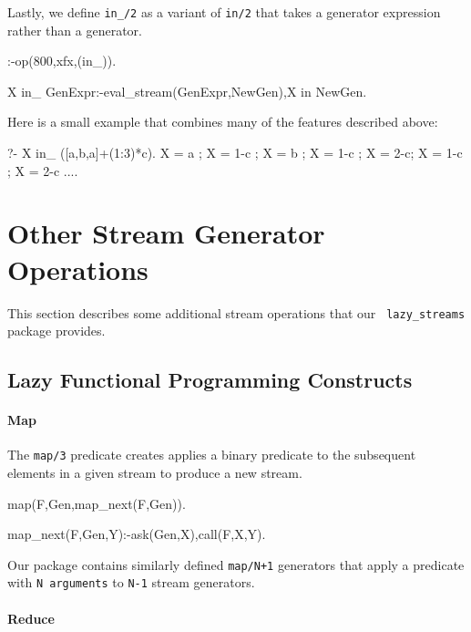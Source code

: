 \documentclass{new_tlp}
\begin{document}
Lastly, we define {\tt in\_/2} as a variant of \texttt{in/2} that takes a 
generator expression rather than a generator.
\begin{code}
:-op(800,xfx,(in_)).

X in_ GenExpr:-eval_stream(GenExpr,NewGen),X in NewGen.     
\end{code}
Here is a small example that combines many of the features described above:
\begin{codex}
?- X in_ ({[a,b,a]}+(1:3)*c).
X = a ; X = 1-c ; X = b ; X = 1-c ; X = 2-c; X = 1-c ; X = 2-c ....
\end{codex}




\section{Other Stream Generator Operations}\label{other}

This section describes some additional stream operations that our {\tt
lazy\_streams} package provides.

\subsection{Lazy Functional Programming Constructs}

\paragraph{Map}

The {\tt map/3} predicate creates applies a binary predicate
to the subsequent elements in a given stream to produce a new stream.
\begin{code}
map(F,Gen,map_next(F,Gen)).

map_next(F,Gen,Y):-ask(Gen,X),call(F,X,Y).
\end{code}

Our package contains similarly defined {\tt map/N+1} generators that
apply a predicate with {\tt N arguments} to
{\tt N-1} stream generators.

\paragraph{Reduce}
\end{document}

